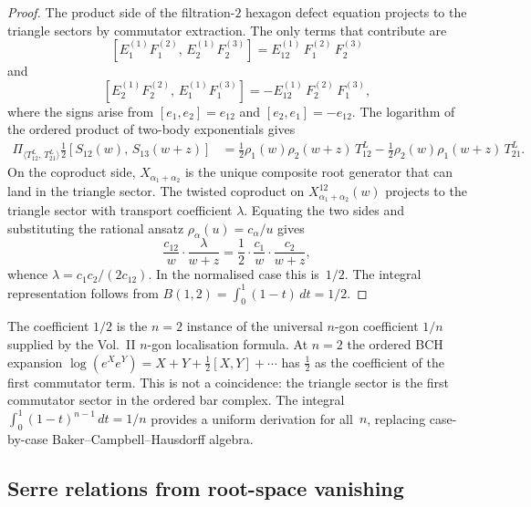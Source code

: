 \begin{proof}
The product side of the filtration-$2$ hexagon defect equation projects
to the triangle sectors by commutator extraction. The only terms that
contribute are
\[
[E_1^{(1)}F_1^{(2)},\,E_2^{(1)}F_2^{(3)}]
=E_{12}^{(1)}\,F_1^{(2)}\,F_2^{(3)}
\]
and
\[
[E_2^{(1)}F_2^{(2)},\,E_1^{(1)}F_1^{(3)}]
=-E_{12}^{(1)}\,F_2^{(2)}\,F_1^{(3)},
\]
where the signs arise from
$[e_1,e_2]=e_{12}$ and $[e_2,e_1]=-e_{12}$.
The logarithm of the ordered product of two-body exponentials gives
\begin{align*}
\Pi_{\langle T^L_{12},\,T^L_{21}\rangle}
\tfrac{1}{2}[S_{12}(w),\,S_{13}(w{+}z)]
&=
\tfrac{1}{2}\rho_1(w)\rho_2(w{+}z)\,T^L_{12}
-\tfrac{1}{2}\rho_2(w)\rho_1(w{+}z)\,T^L_{21}.
\end{align*}
On the coproduct side, $X_{\alpha_1+\alpha_2}$ is the unique composite
root generator that can land in the triangle sector. The twisted
coproduct on $X_{\alpha_1+\alpha_2}^{12}(w)$ projects to the triangle
sector with transport coefficient $\lambda$. Equating the two sides and
substituting the rational ansatz $\rho_\alpha(u)=c_\alpha/u$ gives
\[
\frac{c_{12}}{w}\cdot\frac{\lambda}{w+z}
=
\frac{1}{2}\cdot\frac{c_1}{w}\cdot\frac{c_2}{w+z},
\]
whence $\lambda=c_1 c_2/(2c_{12})$. In the normalised case this
is~$1/2$. The integral representation follows from
$B(1,2)=\int_0^1(1-t)\,dt=1/2$.
\end{proof}

\begin{remark}
\label{rem:triangle-as-bch}
The coefficient $1/2$ is the $n=2$ instance of the universal $n$-gon
coefficient $1/n$ supplied by the Vol.~II $n$-gon localisation formula.
At $n=2$ the ordered BCH expansion
$\log(e^X e^Y)=X+Y+\frac12[X,Y]+\cdots$
has $\frac12$ as the coefficient of the first commutator term. This is
not a coincidence: the triangle sector is the first commutator sector
in the ordered bar complex. The integral $\int_0^1(1-t)^{n-1}\,dt=1/n$
provides a uniform derivation for all~$n$, replacing case-by-case
Baker--Campbell--Hausdorff algebra.
\end{remark}

\subsection{Serre relations from root-space vanishing}

